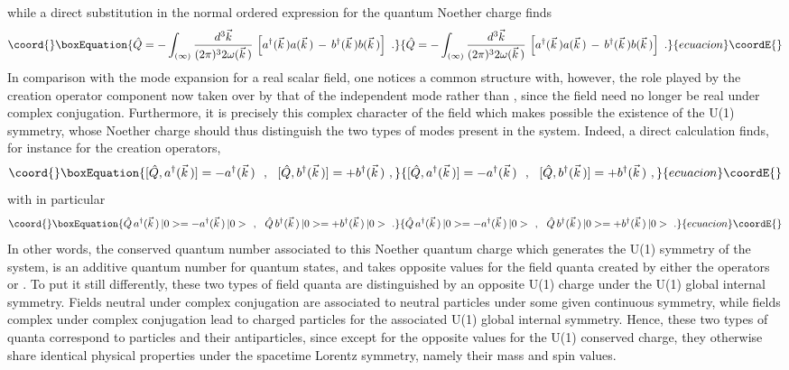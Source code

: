 \documentclass[a4paper,11pt]{article}
\begin{document}
while a direct substitution in the normal ordered expression for the quantum
Noether charge \coordHE{} finds
\begin{equation}\coord{}\boxEquation{
\hat{Q}=-\int_{(\infty)}\frac{d^3\vec{k}}{(2\pi)^32\omega(\vec{k}\,)}\,
\left[a^\dagger(\vec{k}\,)a(\vec{k}\,)\,-\,
b^\dagger(\vec{k}\,)b(\vec{k}\,)\right]\ .
}{
\hat{Q}=-\int_{(\infty)}\frac{d^3\vec{k}}{(2\pi)^32\omega(\vec{k}\,)}\,
\left[a^\dagger(\vec{k}\,)a(\vec{k}\,)\,-\,
b^\dagger(\vec{k}\,)b(\vec{k}\,)\right]\ .
}{ecuacion}\coordE{}\end{equation}
In comparison with the mode expansion for a real scalar field, one notices
a common structure with, however, the role played by the creation operator
component now taken over by that of the independent mode \coordHE{}
rather than \coordHE{}, since the field need no longer be real
under complex conjugation. Furthermore, it is precisely this complex
character of the field which makes possible the existence of the U(1)
symmetry, whose Noether charge should thus distinguish the two types of
modes present in the system. Indeed, a direct calculation finds, for
instance for the creation operators,
\begin{equation}\coord{}\boxEquation{
[\hat{Q},a^\dagger(\vec{k}\,)]=-a^\dagger(\vec{k}\,)\ \ ,\ \ 
[\hat{Q},b^\dagger(\vec{k}\,)]=+b^\dagger(\vec{k}\,)\ ,
}{
[\hat{Q},a^\dagger(\vec{k}\,)]=-a^\dagger(\vec{k}\,)\ \ ,\ \ 
[\hat{Q},b^\dagger(\vec{k}\,)]=+b^\dagger(\vec{k}\,)\ ,
}{ecuacion}\coordE{}\end{equation}
with in particular
\begin{equation}\coord{}\boxEquation{
\hat{Q}\,a^\dagger(\vec{k}\,)\,|0>=-a^\dagger(\vec{k}\,)\,|0>\ \ ,\ \ 
\hat{Q}\,b^\dagger(\vec{k}\,)\,|0>=+b^\dagger(\vec{k}\,)\,|0>\ .
}{
\hat{Q}\,a^\dagger(\vec{k}\,)\,|0>=-a^\dagger(\vec{k}\,)\,|0>\ \ ,\ \ 
\hat{Q}\,b^\dagger(\vec{k}\,)\,|0>=+b^\dagger(\vec{k}\,)\,|0>\ .
}{ecuacion}\coordE{}\end{equation}
In other words, the conserved quantum number \coordHE{} associated to this Noether
quantum charge which generates the U(1) symmetry of the system, is an additive
quantum number for quantum states, and takes opposite values for the
field quanta created by either the operators \coordHE{}
or \myHighlight{$b^\dagger(\vec{k}\,)$}\coordHE{}. To put it still differently, these two
types of field quanta are distinguished by an opposite U(1) charge
under the U(1) global internal symmetry. Fields neutral under complex
conjugation are associated to neutral particles under some given continuous
symmetry, while fields complex under complex conjugation lead to charged
particles for the associated U(1) global internal symmetry. Hence, these
two types of quanta correspond to particles and their antiparticles, since
except for the opposite values for the U(1) conserved charge, they otherwise
share identical physical properties under the spacetime Lorentz symmetry,
namely their mass and spin values.
\end{document}
